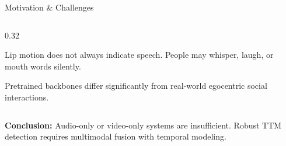 \documentclass[aspectratio=169, 10pt]{beamer}
\begin{document}
\begin{frame}{Motivation \& Challenges}
\begin{columns}[T,onlytextwidth]
\begin{column}{0.32\textwidth}

\begin{tcolorbox}[
purplecard,
title={\small Lip Movement Ambiguity},
boxsep=2pt,
left=3pt,right=3pt,
top=3pt,bottom=3pt]

\footnotesize
Lip motion does not always indicate speech. People may whisper, laugh, or mouth words silently.

\end{tcolorbox}

\vspace{2pt}

\begin{tcolorbox}[
purplecard,
title={\small Pre-training Domain Gap},
boxsep=2pt,
left=3pt,right=3pt,
top=3pt,bottom=3pt]

\footnotesize
Pretrained backbones differ significantly from real-world egocentric social interactions.

\end{tcolorbox}

\end{column}

\end{columns}

\vspace{3pt}

\begin{tcolorbox}[
bluecard,
boxsep=2pt,
left=3pt,right=3pt,
top=3pt,bottom=3pt]

\small
\textbf{Conclusion:} Audio-only or video-only systems are insufficient. 
Robust TTM detection requires multimodal fusion with temporal modeling.

\end{tcolorbox}

\end{frame}
\end{document}
